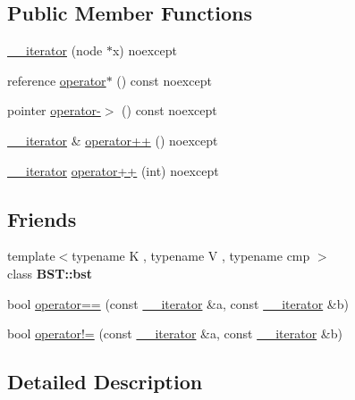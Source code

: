 \subsection*{Public Member Functions}
\begin{DoxyCompactItemize}
\item 
\hyperlink{classAP__it_1_1____iterator_a7286a573bdc1fa300c664c316564c1a2}{\+\_\+\+\_\+iterator} (node $\ast$x) noexcept
\item 
reference \hyperlink{classAP__it_1_1____iterator_a8bbe7fd8bc25d7f80eecdec977272828}{operator$\ast$} () const noexcept
\item 
pointer \hyperlink{classAP__it_1_1____iterator_ad592364949f9c5ff5173f39d31f0eb11}{operator-\/$>$} () const noexcept
\item 
\hyperlink{classAP__it_1_1____iterator}{\+\_\+\+\_\+iterator} \& \hyperlink{classAP__it_1_1____iterator_a54350866b6f1b6a9be788805a1982142}{operator++} () noexcept
\item 
\hyperlink{classAP__it_1_1____iterator}{\+\_\+\+\_\+iterator} \hyperlink{classAP__it_1_1____iterator_a690a182c9ef272c5acca82bb2dfe211e}{operator++} (int) noexcept
\end{DoxyCompactItemize}
\subsection*{Friends}
\begin{DoxyCompactItemize}
\item 
\mbox{\label{classAP__it_1_1____iterator_a58ed1dfd1f1b7dd9f3d4f2695f53ac12}} 
{\footnotesize template$<$typename K , typename V , typename cmp $>$ }\\class {\bfseries B\+S\+T\+::bst}
\item 
bool \hyperlink{classAP__it_1_1____iterator_a2e5014cb825532053115734598e16318}{operator==} (const \hyperlink{classAP__it_1_1____iterator}{\+\_\+\+\_\+iterator} \&a, const \hyperlink{classAP__it_1_1____iterator}{\+\_\+\+\_\+iterator} \&b)
\item 
bool \hyperlink{classAP__it_1_1____iterator_add0144e7693bde5e4b509b5fd8dc5c96}{operator!=} (const \hyperlink{classAP__it_1_1____iterator}{\+\_\+\+\_\+iterator} \&a, const \hyperlink{classAP__it_1_1____iterator}{\+\_\+\+\_\+iterator} \&b)
\end{DoxyCompactItemize}


\subsection{Detailed Description}

